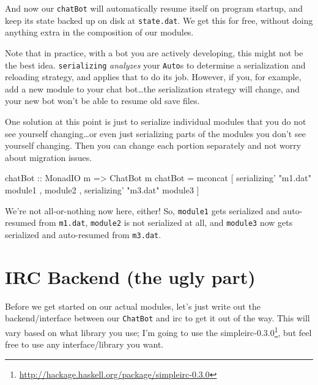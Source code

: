 \documentclass[]{article}
\newenvironment{Shaded}{}{}
\newcommand{\DataTypeTok}[1]{\textcolor[rgb]{0.56,0.13,0.00}{{#1}}}
\newcommand{\StringTok}[1]{\textcolor[rgb]{0.25,0.44,0.63}{{#1}}}
\newcommand{\OtherTok}[1]{\textcolor[rgb]{0.00,0.44,0.13}{{#1}}}
\newcommand{\FunctionTok}[1]{\textcolor[rgb]{0.02,0.16,0.49}{{#1}}}
\newcommand{\NormalTok}[1]{{#1}}
\renewcommand{\href}[2]{#2\footnote{\url{#1}}}
\begin{document}
And now our \texttt{chatBot} will automatically resume itself on program
startup, and keep its state backed up on disk at \texttt{state.dat}. We
get this for free, without doing anything extra in the composition of
our modules.

Note that in practice, with a bot you are actively developing, this
might not be the best idea. \texttt{serializing\textquotesingle{}}
\emph{analyzes} your \texttt{Auto}s to determine a serialization and
reloading strategy, and applies that to do its job. However, if you, for
example, add a new module to your chat bot\ldots{}the serialization
strategy will change, and your new bot won't be able to resume old save
files.

One solution at this point is just to serialize individual modules that
you do not see yourself changing\ldots{}or even just serializing parts
of the modules you don't see yourself changing. Then you can change each
portion separately and not worry about migration issues.

\begin{Shaded}
\begin{Highlighting}[]
\OtherTok{chatBot ::} \DataTypeTok{MonadIO} \NormalTok{m }\OtherTok{=>} \DataTypeTok{ChatBot} \NormalTok{m}
\NormalTok{chatBot }\FunctionTok{=} \NormalTok{mconcat [ serializing' }\StringTok{"m1.dat"} \NormalTok{module1}
                  \NormalTok{, module2}
                  \NormalTok{, serializing' }\StringTok{"m3.dat"} \NormalTok{module3}
                  \NormalTok{]}
\end{Highlighting}
\end{Shaded}

We're not all-or-nothing now here, either! So, \texttt{module1} gets
serialized and auto-resumed from \texttt{m1.dat}, \texttt{module2} is
not serialized at all, and \texttt{module3} now gets serialized and
auto-resumed from \texttt{m3.dat}.

\section{IRC Backend (the ugly part)}\label{irc-backend-the-ugly-part}

Before we get started on our actual modules, let's just write out the
backend/interface between our \texttt{ChatBot} and irc to get it out of
the way. This will vary based on what library you use; I'm going to use
the
\href{http://hackage.haskell.org/package/simpleirc-0.3.0}{simpleirc-0.3.0},
but feel free to use any interface/library you want.
\end{document}

